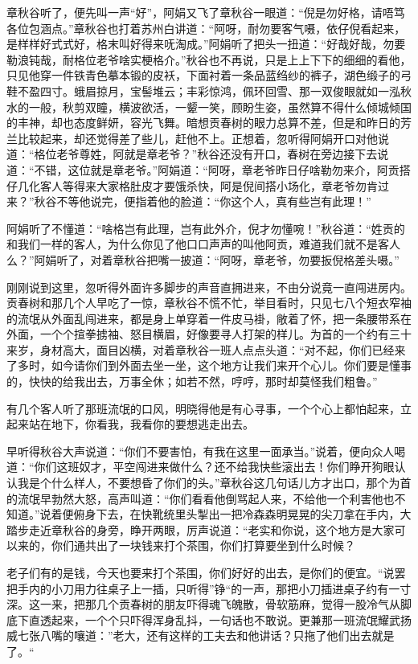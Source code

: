 \documentclass[12pt,UTF8]{ctexbook}
\begin{document}
{{{章秋谷听了，便先叫一声“好”，阿娟又飞了章秋谷一眼道：“倪是勿好格，请唔笃各位包涵点。”章秋谷也打着苏州白讲道：“阿呀，耐勿要客气嗫，依仔倪看起来，是样样好式式好，格末叫好得来呒淘成。”阿娟听了把头一扭道：“好哉好哉，勿要勒浪钝哉，耐格位老爷啥实梗格介。”秋谷也不再说，只是上上下下的细细的看他，只见他穿一件铁青色摹本锻的皮袄，下面衬着一条品蓝绉纱的裤子，湖色缎子的弓鞋不盈四寸。蛾眉掠月，宝髻堆云；丰彩惊鸿，佩环回雪、那一双俊眼就如一泓秋水的一般，秋剪双瞳，横波欲活，一颦一笑，顾盼生姿，虽然算不得什么倾城倾国的丰神，却也态度鲜妍，容光飞舞。暗想贡春树的眼力总算不差，但是和昨日的芳兰比较起来，却还觉得差了些儿，赶他不上。正想着，忽听得阿娟开口对他说道：“格位老爷尊姓，阿就是章老爷？”秋谷还没有开口，春树在旁边接下去说道：“不错，这位就是章老爷。”阿娟道：“阿呀，章老爷昨日仔啥勒勿来介，阿贡搭仔几化客人等得来大家格肚皮才要饿杀快，阿是倪间搭小场化，章老爷勿肯过来？”秋谷不等他说完，便指着他的脸道：“你这个人，真有些岂有此理！”

阿娟听了不懂道：“啥格岂有此理，岂有此外介，倪才勿懂啘！”秋谷道：“姓贡的和我们一样的客人，为什么你见了他口口声声的叫他阿贡，难道我们就不是客人么？”阿娟听了，对着章秋谷把嘴一披道：“阿呀，章老爷，勿要扳倪格差头嗫。”

刚刚说到这里，忽听得外面许多脚步的声音直拥进来，不由分说竟一直闯进房内。贡春树和那几个人早吃了一惊，章秋谷不慌不忙，举目看时，只见七八个短衣窄袖的流氓从外面乱闯进来，都是身上单穿着一件皮马褂，敞着了怀，把一条腰带系在外面，一个个揎拳掳袖、怒目横眉，好像要寻人打架的样儿。为首的一个约有三十来岁，身材高大，面目凶横，对着章秋谷一班人点点头道：“对不起，你们已经来了多时，如今请你们到外面去坐一坐，这个地方让我们来开个心儿。你们要是懂事的，快快的给我出去，万事全休；如若不然，哼哼，那时却莫怪我们粗鲁。”

有几个客人听了那班流氓的口风，明晓得他是有心寻事，一个个心上都怕起来，立起来站在地下，你看我，我看你的要想逃走出去。

早听得秋谷大声说道：“你们不要害怕，有我在这里一面承当。”说着，便向众人喝道：“你们这班奴才，平空闯进来做什么？还不给我快些滚出去！你们睁开狗眼认认我是个什么样人，不要想昏了你们的头。”章秋谷这几句话儿方才出口，那个为首的流氓早勃然大怒，高声叫道：“你们看看他倒骂起人来，不给他一个利害他也不知道。”说着便俯身下去，在快靴统里头掣出一把冷森森明晃晃的尖刀拿在手内，大踏步走近章秋谷的身旁，睁开两眼，厉声说道：“老实和你说，这个地方是大家可以来的，你们通共出了一块钱来打个茶围，你们打算要坐到什么时候？

老子们有的是钱，今天也要来打个茶围，你们好好的出去，是你们的便宜。“说罢把手内的小刀用力往桌子上一插，只听得”铮“的一声，那把小刀插进桌子约有一寸深。这一来，把那几个贡春树的朋友吓得魂飞魄散，骨软筋麻，觉得一股冷气从脚底下直透起来，一个个只吓得浑身乱抖，一句话也不敢说。更兼那一班流氓耀武扬威七张八嘴的嚷道：”老大，还有这样的工夫去和他讲话？只拖了他们出去就是了。“

}}}
\end{document}
